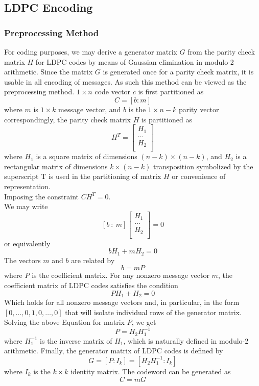 \subsection{LDPC Encoding}
\subsubsection{Preprocessing Method}
For coding purposes, we may derive a generator matrix $G$ from the parity check matrix $H$ for LDPC codes by means of Gaussian elimination in modulo-2 arithmetic. Since the matrix $G$ is generated once for a parity check matrix, it is usable in all encoding of messages. As such this method can be viewed as the preprocessing method. $1 \times n$ code vector $c$ is first partitioned as
\[C = [b : m]\]
where $m$ is $1 \times k$ message vector, and $b$ is the $1 \times n-k$ parity vector correspondingly, the parity check matrix $H$ is partitioned as
\[H^T=\left[\begin{matrix}H_1\\\ldots\\H_2\\\end{matrix}\right]\]
where $H_1$ is a square matrix of dimensions $(n - k)\times (n - k)$, and $H_2$ is a rectangular matrix of dimensions $k\times (n- k)$ transposition symbolized by the superscript T is used in the partitioning of matrix $H$ or convenience of representation. \\
Imposing the constraint $C H^T = 0$. \\
We may write
\[\left[b\ :\ m\right]\left[\begin{matrix}H_1\\ \ldots\\H_2\\\end{matrix}\right]=0\]
or equivalently
\[bH_1 + m H_2 = 0\]
The vectors $m$ and $b$ are related by
\[b = m P\]
where $P$ is the coefficient matrix. For any nonzero message vector $m$, the coefficient matrix of LDPC codes satisfies the condition
\[P H_1 + H_2 = 0\]
Which holds for all nonzero message vectors and, in particular, in the form $[0, \ldots, 0, 1, 0, \ldots, 0]$ that will isolate individual rows of the generator matrix. Solving the above Equation for matrix $P$, we get
\[P = H_2 H_{1}^{-1}\] 
where $H_{1}^{-1}$ is the inverse matrix of $H_1$, which is naturally defined in modulo-2 arithmetic. Finally, the generator matrix of LDPC codes is defined by
\[G = [P : I_k ] = [H_2 H_{1}^{-1} : I_k ]\]
where $I_k$ is the $k \times k$ identity matrix. The codeword can be generated as
\[C = mG\]

